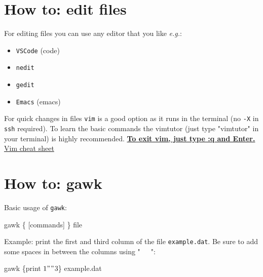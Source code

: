 \documentclass[
  letterpaper,
  DIV=11,
  numbers=noendperiod]{scrreprt}
\newenvironment{Shaded}{\begin{snugshade}}{\end{snugshade}}
\newcommand{\FunctionTok}[1]{\textcolor[rgb]{0.28,0.35,0.67}{#1}}
\newcommand{\NormalTok}[1]{\textcolor[rgb]{0.00,0.23,0.31}{#1}}
\newcommand{\StringTok}[1]{\textcolor[rgb]{0.13,0.47,0.30}{#1}}
\begin{document}
\hypertarget{how-to-edit-files}{%
\chapter*{How to: edit files}\label{how-to-edit-files}}


For editing files you can use any editor that you like \emph{e.g.}:

\begin{itemize}
\item
  \texttt{VSCode} (code)
\item
  \texttt{nedit}
\item
  \texttt{gedit}
\item
  \texttt{Emacs} (emacs)
\end{itemize}

For quick changes in files \texttt{vim} is a good option as it runs in
the terminal (no \texttt{-X} in \texttt{ssh} required). To learn the
basic commands the vimtutor (just type "vimtutor" in your terminal) is
highly recommended.
\href{https://stackoverflow.com/questions/11828270/how-do-i-exit-vim}{\textbf{To
exit vim, just type :q and Enter.}}\\

\href{https://github.com/LeCoupa/awesome-cheatsheets/blob/master/tools/vim.txt}{Vim
cheat sheet}\\

\hypertarget{how-to-gawk}{%
\chapter*{How to: gawk}\label{how-to-gawk}}


Basic usage of \texttt{gawk}:

\begin{Shaded}
\begin{Highlighting}[]
\NormalTok{gawk \textquotesingle{}\{ [commands] \}\textquotesingle{} file}
\end{Highlighting}
\end{Shaded}

Example: print the first and third column of the file
\texttt{example.dat}. Be sure to add some spaces in between the columns
using "~~~":

\begin{Shaded}
\begin{Highlighting}[]
\FunctionTok{gawk} \StringTok{\textquotesingle{}\{print $1"   "$3\}\textquotesingle{}}\NormalTok{ example.dat}
\end{Highlighting}
\end{Shaded}
\end{document}
